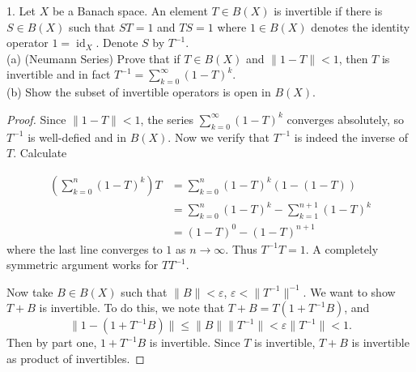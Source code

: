 \begin{problem}
	1. Let $X$ be a Banach space. An element $T \in B(X)$ is invertible if there is $S \in B(X)$ such that $S T=1$ and $T S=1$ where $1 \in B(X)$ denotes the identity operator $1=\operatorname{id}_X$. Denote $S$ by $T^{-1}$.\\
(a) (Neumann Series) Prove that if $T \in B(X)$ and $\|1-T\|<1$, then $T$ is invertible and in fact $T^{-1}=\sum_{k=0}^{\infty}(1-T)^k$.\\
(b) Show the subset of invertible operators is open in $B(X)$.
\end{problem}
\begin{proof}
	Since $\|1 - T\| < 1$, the series $\sum_{k = 0}^\infty (1 - T)^k$ converges absolutely, so $T^{- 1}$ is well-defied and in $B(X)$. Now we verify that $T^{ - 1}$ is indeed the inverse of $T$. Calculate

	\begin{align*}
		\left( \sum_{k = 0}^n (1 - T)^k \right) T
		&= \sum_{k = 0}^n (1 - T)^k (1 - (1 - T)) \\
		&= \sum_{k = 0}^n (1 - T)^k 
		- \sum_{k = 1}^{n + 1} (1 - T)^k \\
		&= (1 - T)^0 - (1 - T)^{ n + 1}
	\end{align*}
	where the last line converges to $1$ as $n \to \infty $. Thus $T^{-1} T = 1$. A completely symmetric argument works for $T T^{-1}$.

	Now take $B \in B(X)$ such that $\|B\| < \varepsilon$, $\varepsilon < \|T^{-1}\|^{-1}$. We want to show $T + B$ is invertible. To do this, we note that $T + B = T (1 + T^{-1} B)$, and 
	\[
		\|1 - (1 + T^{-1}B)\| \le \|B\| \|T^{-1}\| < \varepsilon \|T^{-1}\| < 1
	.\] 
	Then by part one, $1 + T^{-1}B$ is invertible. Since $T$ is invertible, $T + B$ is invertible as product of invertibles.
\end{proof}



